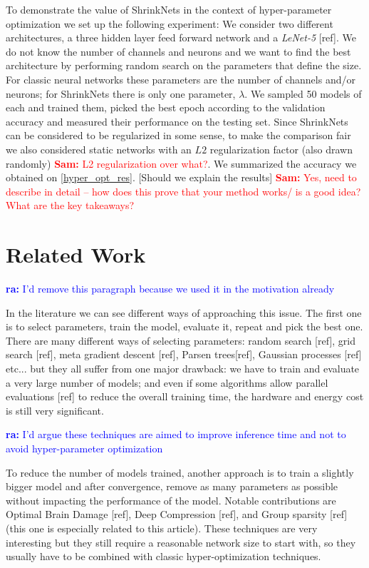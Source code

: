 \documentclass[sigconf]{acmart}
\newcommand{\srm}[1]{\textcolor{red}{{\bf Sam:} #1}}
\newcommand{\ra}[1]{\textcolor{blue}{{\bf ra:} #1}}
\begin{document}
To demonstrate the value of ShrinkNets in the context of hyper-parameter
optimization we set up the following experiment: We consider two different
architectures, a three hidden layer feed forward network and a \textit{LeNet-5}
[ref]. We do not know the number of channels and neurons and we want to find the
best architecture by performing random search on the parameters that define the
size. For classic neural networks these parameters are the number of channels
and/or neurons; for ShrinkNets there is only one parameter, $\lambda$. We
sampled 50 models of each and trained them, picked the best epoch according to
the validation accuracy and measured their performance on the testing set. Since
ShrinkNets can be considered to be regularized in some sense, to make the
comparison fair we also considered static networks with an $L2$ regularization
factor (also drawn randomly) \srm{L2 regularization over what?}. We summarized
the accuracy we obtained on \autoref{hyper_opt_res}. [Should we explain the
results] \srm{Yes, need to describe in detail -- how does this prove that your
method works/ is a good idea?  What are the key takeaways?}

\section{Related Work}

\ra{I'd remove this paragraph because we used it in the motivation already}
\par In the literature we can see different ways of approaching this issue. The
first one is to select parameters, train the model, evaluate it, repeat and pick
the best one. There are many different ways of selecting parameters: random
search [ref], grid search [ref], meta gradient descent [ref], Parsen trees[ref],
Gaussian processes [ref] etc... but they all suffer from one major drawback: we
have to train and evaluate a very large number of models; and even if some
algorithms allow parallel evaluations [ref] to reduce the overall training time,
the hardware and energy cost is still very significant.  

\ra{I'd argue these techniques are aimed to improve inference time and not to
avoid hyper-parameter optimization}
\par To reduce the number of models trained, another approach is to train a
slightly bigger model and after convergence, remove as many parameters as
possible without impacting the performance of the model. Notable contributions
are Optimal Brain Damage [ref], Deep Compression [ref], and Group sparsity [ref]
(this one is especially related to this article). These techniques are very
interesting but they still require a reasonable network size to start with, so
they usually have to be combined with classic hyper-optimization techniques.  
\end{document}
